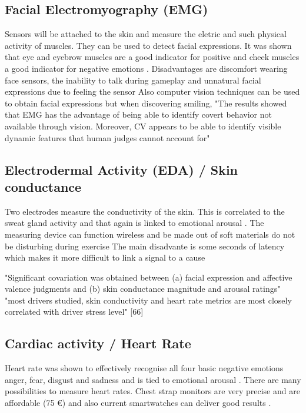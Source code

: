 \subsection{Facial Electromyography (EMG)}
Sensors will be attached to the skin and measure the eletric and such physical activity of muscles. They can be used to detect facial expressions. It was shown that eye \cite{ravaja2018phasic} and eyebrow muscles are a good indicator for positive and cheek muscles a good indicator for negative emotions \cite{nacke2015physiological,mandryk2006using}. 
Disadvantages are discomfort wearing face sensors, the inability to talk during gameplay and unnatural facial expressions due to feeling the sensor \cite{nacke2015physiological}
Also computer vision techniques can be used to obtain facial expressions but when discovering smiling, "The results showed that EMG has the advantage of
being able to identify covert behavior not available through
vision. Moreover, CV appears to be able to identify visible
dynamic features that human judges cannot account for" \cite{hernandez19invisible}

\subsection{Electrodermal Activity (EDA) / Skin conductance}
Two electrodes measure the conductivity of the skin. This is correlated to the sweat gland activity and that again is linked to emotional arousal \cite{nacke2015physiological, dawson2000electrodermal}. The measuring device can function wireless and be made out of soft materials \cite{kim2021soft} do not be disturbing during exercise 
The main disadvante is some seconds of latency which makes it more difficult to link a signal to a cause \cite{nacke2015physiological} 

"Significant covariation was obtained between (a) facial expression and affective valence judgments and (b) skin conductance magnitude and arousal ratings" \cite{lang93pictures}
"most drivers studied, skin conductivity and heart rate metrics are most closely correlated with driver stress level" [66]


\subsection{Cardiac activity / Heart Rate}
Heart rate was shown to effectively recognise all four basic negative emotions anger, fear, disgust and sadness \cite{levenson2003blood} and is tied to emotional arousal \cite{nacke2015physiological}. There are many possibilities to measure heart rates. Chest strap monitors are very precise and are affordable (75 €) \cite{link_herzfrequenzsensor} and also current smartwatches can deliver good results \cite{gillinov2017variable}.

